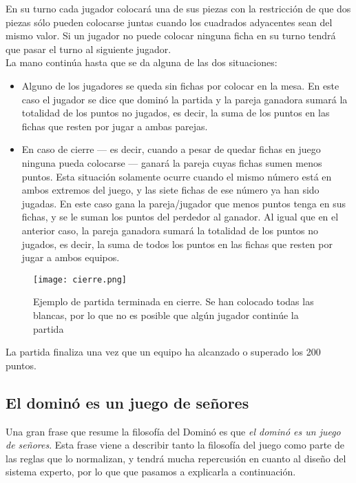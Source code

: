 En su turno cada jugador colocará una de sus piezas con la restricción de que dos piezas sólo pueden
colocarse juntas cuando los cuadrados adyacentes sean del mismo valor. Si un jugador no puede colocar
ninguna ficha en su turno tendrá que pasar el turno al siguiente jugador. \\

La mano continúa hasta que se da alguna de las dos situaciones:
\begin{itemize}
    \item Alguno de los jugadores se queda sin fichas por colocar en la mesa. En este caso el jugador se
        dice que dominó la partida y la pareja ganadora sumará la totalidad de los puntos no jugados,
        es decir, la suma de los puntos en las fichas que resten por jugar a ambas parejas.
    \item En caso de cierre --- es decir, cuando a pesar de quedar fichas en juego ninguna pueda colocarse ---
        ganará la pareja cuyas fichas sumen menos puntos. Esta situación solamente ocurre cuando el mismo número
        está en ambos extremos del juego, y las siete fichas de ese número ya han sido jugadas. En este caso
        gana la pareja/jugador que menos puntos tenga en sus fichas, y se le suman los puntos del perdedor al ganador.
        Al igual que en el anterior caso, la pareja ganadora sumará la totalidad de los puntos no jugados,
        es decir, la suma de todos los puntos en las fichas que resten por jugar a ambos equipos.
\end{itemize}

\begin{figure}[h]
  \begin{center}
    \texttt{[image: cierre.png]}
  \end{center}
  \caption{Ejemplo de partida terminada en cierre. Se han colocado todas las blancas, por lo que no es posible
            que algún jugador continúe la partida}
  \label{cierre}
\end{figure}


La partida finaliza una vez que un equipo ha alcanzado o superado los 200 puntos. \\

\subsection{El dominó es un juego de señores}

Una gran frase que resume la filosofía del Dominó es que \emph{el dominó es un juego de señores}. Esta frase
viene a describir tanto la filosofía del juego como parte de las reglas que lo normalizan, y tendrá mucha
repercusión en cuanto al diseño del sistema experto, por lo que que pasamos a explicarla a continuación. \\

